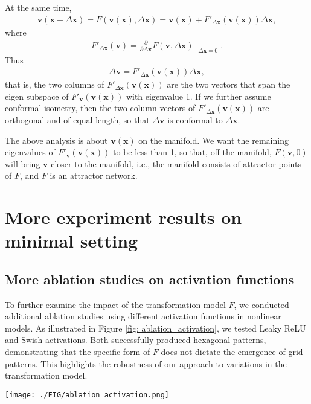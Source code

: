 \documentclass{article}
\def\vv{{\bm{v}}}
\def\vx{{\bm{x}}}
\begin{document}
At the same time, 
\begin{eqnarray}
   \vv(\vx+\Delta \vx) = F(\vv(\vx), \Delta \vx) = \vv(\vx) + F'_{\Delta \vx}(\vv(\vx)) \Delta \vx, 
\end{eqnarray}
where 
\begin{eqnarray}
   F'_{\Delta \vx}(\vv) = \frac{\partial}{\partial \Delta \vx} F(\vv, \Delta \vx) \mid_{\Delta \vx = 0}. 
\end{eqnarray}
Thus 
\begin{eqnarray}
   \Delta \vv = F'_{\Delta \vx}(\vv(\vx)) \Delta \vx,
\end{eqnarray}
that is, the two columns of $F'_{\Delta \vx}(\vv(\vx))$ are the two vectors that span the eigen subspace of $F'_\vv(\vv(\vx))$ with eigenvalue 1. If we further assume conformal isometry, then the two column vectors of $F'_{\Delta \vx}(\vv(\vx))$ are orthogonal and of equal length, so that $\Delta \vv$ is conformal to $\Delta \vx$. 

The above analysis is about $\vv(\vx)$ on the manifold. We want the remaining eigenvalues of $F'_\vv(\vv(\vx))$ to be less than 1, so that, off the manifold, $F(\vv, 0)$ will bring $\vv$ closer to the manifold, i.e., the manifold consists of attractor points of $F$, and $F$ is an attractor network. 

\section{More experiment results on minimal setting}
\subsection{More ablation studies on activation functions}
\label{sec:more_activation}
To further examine the impact of the transformation model $F$, we conducted additional ablation studies using different activation functions in nonlinear models. As illustrated in Figure \ref{fig: ablation_activation}, we tested Leaky ReLU and Swish activations. Both successfully produced hexagonal patterns, demonstrating that the specific form of $F$ does not dictate the emergence of grid patterns. This highlights the robustness of our approach to variations in the transformation model.

\begin{figure*}[ht]
\centering
  \texttt{[image: ./FIG/ablation\_activation.png]} \\
  \caption{\small More activation functions: (a) Leaky ReLU and (b) Swish.}
  \label{fig: ablation_activation}
\end{figure*}
\end{document}
